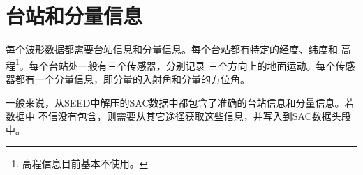 \section{台站和分量信息}
每个波形数据都需要台站信息和分量信息。每个台站都有特定的经度、纬度和
高程\footnote{高程信息目前基本不使用。}。每个台站处一般有三个传感器，分别记录
三个方向上的地面运动。每个传感器都有一个分量信息，即分量的入射角和分量的方位角。

一般来说，从SEED中解压的SAC数据中都包含了准确的台站信息和分量信息。若数据中
不信没有包含，则需要从其它途径获取这些信息，并写入到SAC数据头段中。
